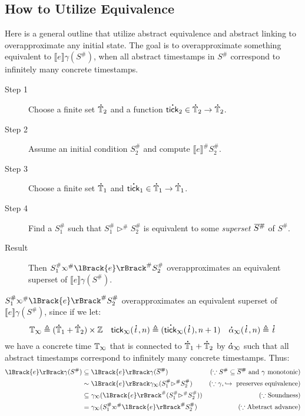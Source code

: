 \documentclass[acmsmall,screen,review]{acmart}\settopmatter{printfolios=true,printccs=false,printacmref=false}
\def\ovbarw{1.2mu}
\def\ovbarh{1}
\newcommand*{\ovbar}[1]{\mkern \ovbarw\overline{\mkern-\ovbarw{\smash{#1}\scalebox{1}[\ovbarh]{\vphantom{i}}}\mkern-\ovbarw}\mkern \ovbarw}
\newcommand*{\A}[1]{\overset{\,_{\mbox{\Large .}}}{#1}}
\newcommand*{\Abs}[1]{{#1}^{\#}}
\newcommand*{\Time}{\mathbb{T}}
\newcommand*{\ATime}{\A{\Time}}
\newcommand*{\semarrow}{\hookrightarrow}
\newcommand*{\semlink}{\mathbin{\rotatebox[origin=c]{180}{$\propto$}}}
\newcommand*{\equivalent}{\sim}
\newcommand*{\sembracket}[1]{\lBrack{#1}\rBrack}
\newcommand*{\tick}{\mathsf{tick}}
\begin{document}
\subsection{How to Utilize Equivalence}
Here is a general outline that utilize abstract equivalence and abstract linking to overapproximate any initial state.
The goal is to overapproximate something equivalent to $\sembracket{e}\gamma(\Abs{S})$, when all abstract timestamps in $\Abs{S}$ correspond to infinitely many concrete timestamps.
\begin{description}
  \item[Step 1] Choose a finite set $\A\Time_2$ and a function $\A\tick_2\in\A\Time_2\rightarrow\A\Time_2$.
  \item[Step 2] Assume an initial condition $\Abs{S}_2$ and compute $\Abs{\sembracket{e}}\Abs{S}_2$.
  \item[Step 3] Choose a finite set $\A\Time_1$ and $\A\tick_1\in\A\Time_1\rightarrow\A\Time_1$.
  \item[Step 4] Find a $\Abs{S}_1$ such that $\Abs{S}_1\Abs\rhd\Abs{S}_2$ is equivalent to some \emph{superset} $\ovbar{\Abs{S}}$ of $\Abs{S}$.
  \item[Result] Then $\Abs{S}_1\Abs\semlink\Abs{\sembracket{e}}\Abs{S}_2$ overapproximates an equivalent superset of $\sembracket{e}\gamma(\Abs{S})$.
\end{description}
$\Abs{S}_1\Abs\semlink\Abs{\sembracket{e}}\Abs{S}_2$ overapproximates an equivalent superset of $\sembracket{e}\gamma(\Abs{S})$, since if we let:
\[\Time_{\semlink}\triangleq(\ATime_1+\ATime_2)\times\mathbb{Z}\quad\tick_{\semlink}(\A{t},n)\triangleq(\A\tick_{\semlink}(\A{t}),n+1)\quad\A\alpha_{\semlink}(\A{t},n)\triangleq\A{t}\]
we have a concrete time $\Time_{\semlink}$ that is connected to $\ATime_1+\ATime_2$ by $\A\alpha_{\semlink}$ such that all abstract timestamps correspond to infinitely many concrete timestamps.
Thus:
\begin{align*}
  \sembracket{e}\gamma(\Abs{S}) & \subseteq\sembracket{e}\gamma(\ovbar{\Abs{S}})                               & (\because\Abs{S}\subseteq\ovbar{\Abs{S}}\text{ and }\gamma\text{ monotonic}) \\
                                & \equivalent\sembracket{e}\gamma_{\semlink}(\Abs{S}_1\Abs\rhd\Abs{S}_2)       & (\because\gamma,\semarrow\text{ preserves equivalence})                      \\
                                & \subseteq\gamma_{\semlink}(\Abs{\sembracket{e}}(\Abs{S}_1\Abs\rhd\Abs{S}_2)) & (\because\text{Soundness})                                                   \\
                                & =\gamma_{\semlink}(\Abs{S}_1\Abs\semlink\Abs{\sembracket{e}}\Abs{S}_2)       & (\because\text{Abstract advance})
\end{align*}
\end{document}
